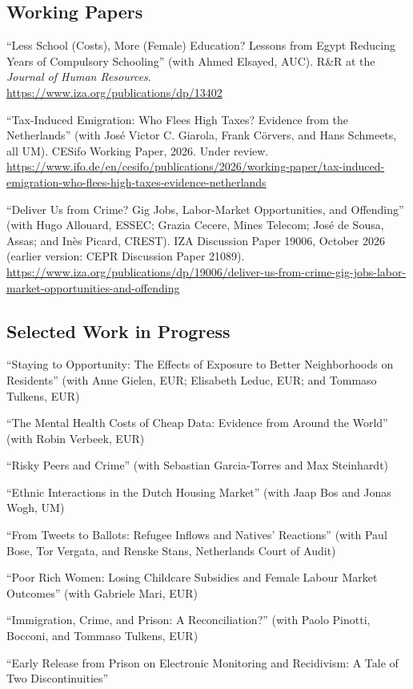 \documentclass[11pt,a4paper]{article}
\begin{document}
\subsection{Working Papers}
\begin{pubs}
  \item ``Less School (Costs), More (Female) Education? Lessons from Egypt Reducing Years of Compulsory Schooling'' (with Ahmed Elsayed, AUC). R\&R at the \emph{Journal of Human Resources}.\\
  \url{https://www.iza.org/publications/dp/13402}
  \item ``Tax-Induced Emigration: Who Flees High Taxes? Evidence from the Netherlands'' (with Jos\'e Victor C. Giarola, Frank C\"orvers, and Hans Schmeets, all UM). CESifo Working Paper, 2026. Under review.\\
  \url{https://www.ifo.de/en/cesifo/publications/2026/working-paper/tax-induced-emigration-who-flees-high-taxes-evidence-netherlands}
  \item ``Deliver Us from Crime? Gig Jobs, Labor-Market Opportunities, and Offending'' (with Hugo Allouard, ESSEC; Grazia Cecere, Mines Telecom; Jos\'e de Sousa, Assas; and In\`es Picard, CREST). IZA Discussion Paper 19006, October 2026 (earlier version: CEPR Discussion Paper 21089).\\
  \url{https://www.iza.org/publications/dp/19006/deliver-us-from-crime-gig-jobs-labor-market-opportunities-and-offending}
\end{pubs}

\subsection{Selected Work in Progress}
\begin{pubs}
  \item ``Staying to Opportunity: The Effects of Exposure to Better Neighborhoods on Residents'' (with Anne Gielen, EUR; Elisabeth Leduc, EUR; and Tommaso Tulkens, EUR)
  \item ``The Mental Health Costs of Cheap Data: Evidence from Around the World'' (with Robin Verbeek, EUR)
  \item ``Risky Peers and Crime'' (with Sebastian Garcia-Torres and Max Steinhardt)
  \item ``Ethnic Interactions in the Dutch Housing Market'' (with Jaap Bos and Jonas Wogh, UM)
  \item ``From Tweets to Ballots: Refugee Inflows and Natives' Reactions'' (with Paul Bose, Tor Vergata, and Renske Stans, Netherlands Court of Audit)
  \item ``Poor Rich Women: Losing Childcare Subsidies and Female Labour Market Outcomes'' (with Gabriele Mari, EUR)
  \item ``Immigration, Crime, and Prison: A Reconciliation?'' (with Paolo Pinotti, Bocconi, and Tommaso Tulkens, EUR)
  \item ``Early Release from Prison on Electronic Monitoring and Recidivism: A Tale of Two Discontinuities''
\end{pubs}
\end{document}
